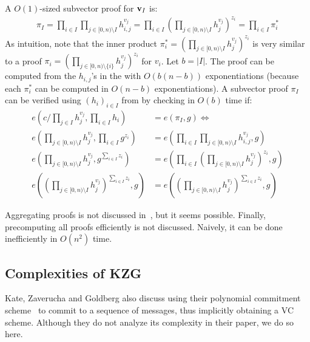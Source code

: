 A $O(1)$-sized subvector proof for $\bm{\mathrm{v}}_I$ is:
\begin{align}
\pi_I = \prod_{i \in I}\prod_{j \in [0,n)\setminus I} h_{i,j}^{v_j}=\prod_{i \in I}\left(\prod_{j \in [0,n)\setminus I} h_{j}^{v_j}\right)^{z_i}=\prod_{i\in I} \pi_i^*
\end{align}
As intuition, note that the inner product $\pi_i^*=\left(\prod_{j \in [0,n)\setminus I} h_{j}^{v_j}\right)^{z_i}$ is very similar to a proof $\pi_i=\left(\prod_{j \in [0,n) \setminus \{i\}} h_{j}^{v_j}\right)^{z_i}$ for $v_i$.
Let $b=|I|$.
The proof can be computed from the $h_{i,j}$'s in the \prk with $O(b(n-b))$ exponentiations (because each $\pi_i^*$ can be computed in $O(n-b)$ exponentiations).
A subvector proof $\pi_I$ can be verified using $(h_i)_{i\in I}$ from \vrk by checking in $O(b)$ time if:
\begin{align}
e\left(c/\prod_{j\in I} h_j^{v_j}, \prod_{i\in I} h_i\right) &= e(\pi_I, g)\Leftrightarrow\\
e\left(\prod_{j\in [0,n)\setminus I} h_j^{v_j}, \prod_{i\in I} g^{z_i}\right) &= e\left(\prod_{i \in I}\prod_{j \in [0,n)\setminus I} h_{i,j}^{v_j}, g\right)\\
e\left(\prod_{j\in [0,n)\setminus I} h_j^{v_j}, g^{\sum_{i\in I} z_i}\right) &= e\left(\prod_{i \in I}\left(\prod_{j \in [0,n)\setminus I} h_{j}^{v_j}\right)^{z_i}, g\right)\\
e\left(\left(\prod_{j\in [0,n)\setminus I} h_j^{v_j}\right)^{\sum_{i\in I} z_i},g\right) &= e\left(\left(\prod_{j \in [0,n)\setminus I} h_{j}^{v_j}\right)^{\sum_{i \in I}z_i}, g\right)
\end{align}

Aggregating proofs is not discussed in~\cite{CF13,LM19}, but it seems possible.
Finally, precomputing all proofs efficiently is not discussed.
Naively, it can be done inefficiently in $O(n^2)$ time.

\subsection{Complexities of KZG~\cite{KZG10a}}
\label{s:complexity-kzg}
Kate, Zaverucha and Goldberg also discuss using their polynomial commitment scheme~\cite{KZG10a} to commit to a sequence of messages, thus implicitly obtaining a VC scheme.
Although they do not analyze its complexity in their paper, we do so here.

